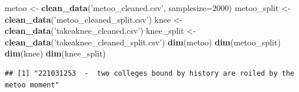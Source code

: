 \documentclass[]{article}
\newenvironment{Shaded}{\begin{snugshade}}{\end{snugshade}}
\newcommand{\KeywordTok}[1]{\textcolor[rgb]{0.13,0.29,0.53}{\textbf{#1}}}
\newcommand{\DataTypeTok}[1]{\textcolor[rgb]{0.13,0.29,0.53}{#1}}
\newcommand{\DecValTok}[1]{\textcolor[rgb]{0.00,0.00,0.81}{#1}}
\newcommand{\StringTok}[1]{\textcolor[rgb]{0.31,0.60,0.02}{#1}}
\newcommand{\CommentTok}[1]{\textcolor[rgb]{0.56,0.35,0.01}{\textit{#1}}}
\newcommand{\OperatorTok}[1]{\textcolor[rgb]{0.81,0.36,0.00}{\textbf{#1}}}
\newcommand{\NormalTok}[1]{#1}
\begin{document}
\begin{Shaded}
\begin{Highlighting}[]
\NormalTok{metoo <-}\StringTok{ }\KeywordTok{clean_data}\NormalTok{(}\StringTok{'metoo_cleaned.csv'}\NormalTok{, }\DataTypeTok{samplesize=}\DecValTok{2000}\NormalTok{)}
\NormalTok{metoo_split <-}\StringTok{ }\KeywordTok{clean_data}\NormalTok{(}\StringTok{'metoo_cleaned_split.csv'}\NormalTok{)}
\NormalTok{knee <-}\StringTok{ }\KeywordTok{clean_data}\NormalTok{(}\StringTok{'takeaknee_cleaned.csv'}\NormalTok{)}
\NormalTok{knee_split <-}\StringTok{ }\KeywordTok{clean_data}\NormalTok{(}\StringTok{'takeaknee_cleaned_split.csv'}\NormalTok{)}
\KeywordTok{dim}\NormalTok{(metoo)}
\KeywordTok{dim}\NormalTok{(metoo_split)}
\KeywordTok{dim}\NormalTok{(knee)}
\KeywordTok{dim}\NormalTok{(knee_split)}
\end{Highlighting}
\end{Shaded}

\begin{Shaded}
\end{Shaded}

\begin{verbatim}
## [1] "221031253  -  two colleges bound by history are roiled by the metoo moment"
\end{verbatim}

\begin{Shaded}
\end{Shaded}
\end{document}
